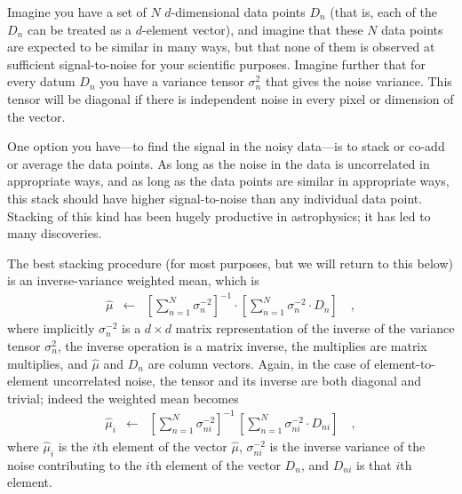 \documentclass[12pt]{article}
\begin{document}
Imagine you have a set of $N$ $d$-dimensional data points $D_n$ (that
is, each of the $D_n$ can be treated as a $d$-element vector), and
imagine that these $N$ data points are expected to be similar in many
ways, but that none of them is observed at sufficient signal-to-noise
for your scientific purposes.  Imagine further that for every datum
$D_n$ you have a variance tensor $\sigma^2_n$ that gives the noise
variance.  This tensor will be diagonal if there is independent noise
in every pixel or dimension of the vector.

One option you have---to find the signal in the noisy data---is to
stack or co-add or average the data points.  As long as the noise in
the data is uncorrelated in appropriate ways, and as long as the data
points are similar in appropriate ways, this stack should have higher
signal-to-noise than any individual data point.  Stacking of this kind
has been hugely productive in astrophysics; it has led to many
discoveries.

The best stacking procedure (for most purposes, but we will return to
this below) is an inverse-variance weighted mean, which is
\begin{eqnarray}\label{eq:stack}
\hat{\mu}
 &\leftarrow&
\left[\sum_{n=1}^N \sigma^{-2}_n\right]^{-1}\cdot\left[\sum_{n=1}^N \sigma^{-2}_n\cdot D_n\right]
 \quad ,
\end{eqnarray}
where implicitly $\sigma^{-2}_n$ is a $d\times d$ matrix
representation of the inverse of the variance tensor $\sigma^2_n$, the
inverse operation is a matrix inverse, the multiplies are matrix
multiplies, and $\hat{\mu}$ and $D_n$ are column vectors.  Again, in
the case of element-to-element uncorrelated noise, the tensor and its
inverse are both diagonal and trivial; indeed the weighted mean
becomes
\begin{eqnarray}
\hat{\mu}_i
 &\leftarrow&
\left[\sum_{n=1}^N \sigma^{-2}_{ni}\right]^{-1}\,\left[\sum_{n=1}^N \sigma^{-2}_{ni}\cdot D_{ni}\right]
 \quad ,
\end{eqnarray}
where $\hat{\mu}_i$ is the $i$th element of the vector $\hat{\mu}$,
$\sigma^{-2}_{ni}$ is the inverse variance of the noise contributing
to the $i$th element of the vector $D_n$, and $D_{ni}$ is that $i$th
element.
\end{document}
